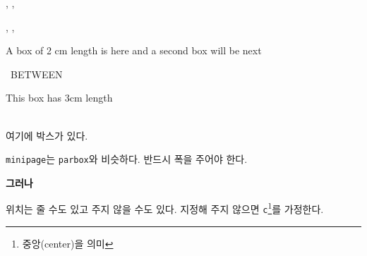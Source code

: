 \documentclass[10pt]{article}
\begin{document}


, , 

, , 

\parbox{2in}{A box of 2 cm length is here
and a second box will be next} \ \hfill BETWEEN \ \hfill
\parbox{3cm}{This box has 3cm length} \\ 

여기에 \hfill {} \hfill 박스가 있다. \\

\begin{minipage}[t]{2in}
\texttt{minipage}는 \texttt{parbox}와 비슷하다.
반드시 폭을 주어야 한다.
\end{minipage} 
\textbf{그러나} \ 
\begin{minipage}[b]{2in}
위치는 줄 수도 있고 주지 않을 수도 있다. 지정해 주지 않으면 \texttt{c}\footnote{중앙(center)을 의미}를 가정한다.
\end{minipage}


\addtolength{\marginparwidth}{-1cm}
\reversemarginpar
{}

\normalmarginpar
\addtolength{\marginparwidth}{1cm}
\end{document}

